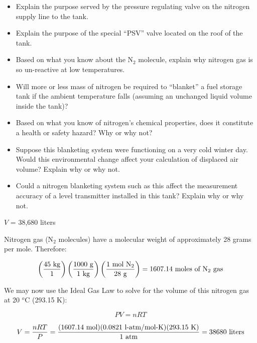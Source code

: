 \begin{itemize}
\item{} Explain the purpose served by the pressure regulating valve on the nitrogen supply line to the tank.
\item{} Explain the purpose of the special ``PSV'' valve located on the roof of the tank.
\item{} Based on what you know about the N$_{2}$ molecule, explain why nitrogen gas is so un-reactive at low temperatures.
\item{} Will more or less mass of nitrogen be required to ``blanket'' a fuel storage tank if the ambient temperature falls (assuming an unchanged liquid volume inside the tank)?
\item{} Based on what you know of nitrogen's chemical properties, does it constitute a health or safety hazard?  Why or why not?
\item{} Suppose this blanketing system were functioning on a very cold winter day.  Would this environmental change affect your calculation of displaced air volume?  Explain why or why not.
\item{} Could a nitrogen blanketing system such as this affect the measurement accuracy of a level transmitter installed in this tank?  Explain why or why not.
\end{itemize}







$V$ = 38,680 liters







Nitrogen gas (N$_{2}$ molecules) have a molecular weight of approximately 28 grams per mole.  Therefore:

$$\left({ 45 \hbox{ kg} \over 1}\right) \left({1000 \hbox{ g} \over 1 \hbox{ kg}}\right) \left( {1 \hbox{ mol N}_2 \over 28 \hbox{ g}} \right) = 1607.14 \hbox{ moles of N}_2 \hbox{ gas}$$

We may now use the Ideal Gas Law to solve for the volume of this nitrogen gas at 20 $^{o}$C (293.15 K):

$$PV = nRT$$

$$V = {nRT \over P} = {(1607.14 \hbox{ mol}) (0.0821 \hbox{ l-atm/mol-K}) (293.15 \hbox{ K}) \over 1 \hbox{ atm}} = 38680 \hbox{ liters}$$


